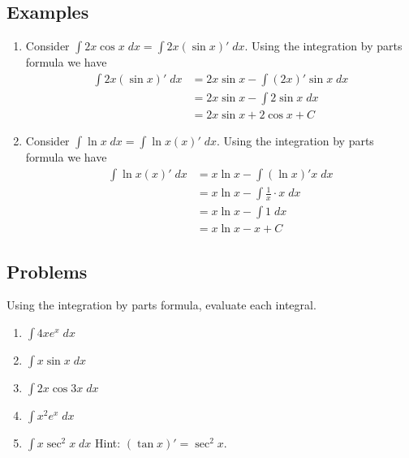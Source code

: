 \documentclass[12pt,letterpaper,fleqn]{article}
\theoremstyle{definition}
\begin{document}
\subsection*{Examples}
\begin{enumerate}
  \item Consider $\int 2x \cos x\;dx = \int 2x (\sin x)'\;dx$. Using the integration by parts formula we have
  \begin{align*}
    \int 2x (\sin x)'\;dx &= 2x \sin x - \int (2x)' \sin x\;dx\\
    &= 2x \sin x - \int 2\sin x\;dx\\
    &= 2x \sin x + 2\cos x + C
  \end{align*}
  \item Consider $\int \ln x\;dx = \int \ln x (x)'\;dx$. Using the integration by parts formula we have
  \begin{align*}
    \int \ln x (x)'\;dx &= x\ln x - \int (\ln x)' x\;dx\\
    &= x\ln x - \int\frac{1}{x} \cdot x\;dx\\
    &= x\ln x - \int 1\;dx\\
    &= x\ln x - x + C
  \end{align*}
\end{enumerate}
\subsection*{Problems}
Using the integration by parts formula, evaluate each integral.
\begin{enumerate}
  \item $\int 4x e^x\;dx$
  \item $\int x \sin x\;dx$
  \item $\int 2x \cos 3x\;dx$
  \item $\int x^2 e^x\;dx$
  \item $\int x \sec^2 x\;dx$ Hint: $(\tan x)' = \sec^2 x$.
\end{enumerate}
\end{document}
